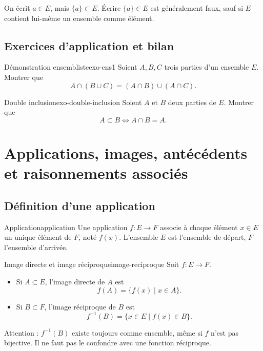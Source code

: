 \documentclass[11pt,a4paper]{article}
\begin{document}
\begin{erreurbox}
On écrit $a\in E$, mais $\{a\}\subset E$. Écrire $\{a\}\in E$ est généralement faux, sauf si $E$ contient lui-même un ensemble comme élément.
\end{erreurbox}

\subsection{Exercices d'application et bilan}

\begin{exercicebox}{Démonstration ensembliste}{exo-ens1}
Soient $A,B,C$ trois parties d'un ensemble $E$. Montrer que
\[
A\cap(B\cup C)=(A\cap B)\cup(A\cap C).
\]
\end{exercicebox}

\begin{exercicebox}{Double inclusion}{exo-double-inclusion}
Soient $A$ et $B$ deux parties de $E$. Montrer que
\[
A\subset B \Longleftrightarrow A\cap B=A.
\]
\end{exercicebox}

\section{Applications, images, antécédents et raisonnements associés}

\subsection{Définition d'une application}

\begin{definitionbox}{Application}{application}
Une application $f:E\to F$ associe à chaque élément $x\in E$ un unique élément de $F$, noté $f(x)$. L'ensemble $E$ est l'ensemble de départ, $F$ l'ensemble d'arrivée.
\end{definitionbox}

\begin{definitionbox}{Image directe et image réciproque}{image-reciproque}
Soit $f:E\to F$.
\begin{itemize}
  \item Si $A\subset E$, l'image directe de $A$ est
  \[
  f(A)=\{f(x)\mid x\in A\}.
  \]
  \item Si $B\subset F$, l'image réciproque de $B$ est
  \[
  f^{-1}(B)=\{x\in E\mid f(x)\in B\}.
  \]
\end{itemize}
Attention : $f^{-1}(B)$ existe toujours comme ensemble, même si $f$ n'est pas bijective. Il ne faut pas le confondre avec une fonction réciproque.
\end{definitionbox}
\end{document}
